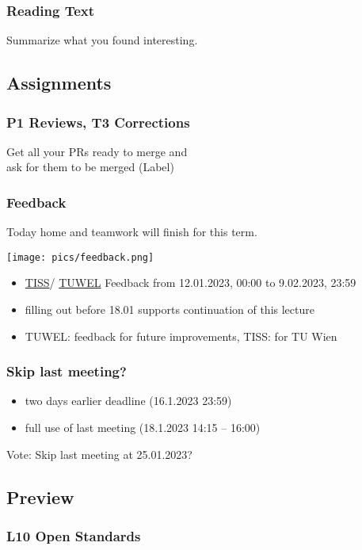 \begin{assignment}
	\frametitle{Reading Text}

	\begin{task}
	Summarize what you found interesting.
	\end{task}
\end{assignment}

\breakframe

\subsection{Assignments}

\begin{frame}
	\frametitle{P1 Reviews, T3 Corrections}

	\begin{task}
	Get all your PRs ready to merge and \\
	ask for them to be merged (Label)
	\end{task}
\end{frame}

\begin{frame}
	\frametitle{Feedback}
	Today home and teamwork will finish for this term.

	\hfill \texttt{[image: pics/feedback.png]}
	\vspace{-1cm}
	\begin{itemize}[<+-| alert@+>]
		\item \href{https://tuwel.tuwien.ac.at/mod/feedback/view.php?id=1661074}{TISS}/
			\href{https://tiss.tuwien.ac.at/survey/surveyForm.xhtml?courseNumber=194114&semesterCode=2022W}{TUWEL}
			Feedback from 12.01.2023, 00:00 to 9.02.2023, 23:59
		\item filling out before 18.01 supports continuation of this lecture
		\item TUWEL: feedback for future improvements, TISS: for TU Wien
	\end{itemize}
\end{frame}

\begin{frame}
	\frametitle{Skip last meeting?}

	\begin{itemize}
	\item two days earlier deadline (16.1.2023 23:59)
	\item full use of last meeting (18.1.2023 14:15 -- 16:00)
	\end{itemize}

	\begin{task}
	Vote: Skip last meeting at 25.01.2023?
	\end{task}
\end{frame}

\subsection{Preview}

\begin{frame}
	\frametitle{L10 Open Standards}
\end{frame}

\appendix

\begin{frame}[allowframebreaks]
	
	
\end{frame}



